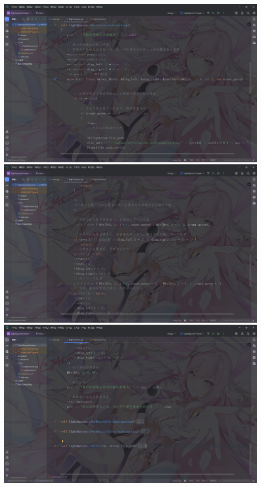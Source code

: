 \documentclass[12pt, a4paper, oneside]{ctexart}
\begin{document}
\includegraphics[width=\textwidth]{../images/递归回溯代码1.png}\\[0.5em]
\includegraphics[width=\textwidth]{../images/递归回溯代码2.png}\\[0.5em]
\includegraphics[width=\textwidth]{../images/递归回溯代码3.png}\\[0.5em]
\end{document}
